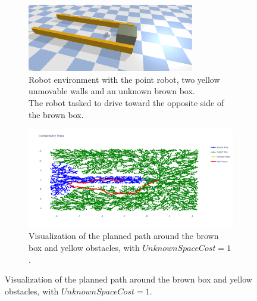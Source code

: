 
\begin{figure}[H]
    \centering
    \begin{subfigure}{\textwidth}
    \centering
    \includegraphics[width=0.8\textwidth]{figures/required_background/push_or_drive} \caption{Robot environment with the point robot, two yellow unmovable walls and an unknown brown box.\\The robot tasked to drive toward the opposite side of the brown box.}
    \end{subfigure}

    \begin{subfigure}{1.11\textwidth}
    \centering
    \includegraphics[width=\textwidth]{figures/required_background/mp/mp_high_fixed_cost}
    \caption{Visualization of the planned path around the brown box and yellow obstacles, with $\mathit{UnknownSpaceCost} = 1$.}
    \end{subfigure}


\end{figure}
